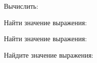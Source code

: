 \begin{enumcols}[label=\textbf{\arabic*.}]
	\item Вычислить:
	\begin{enumcols}[itemcolumns=2]
		\item {}
		\item {}
		\item {}
		\item {}
		\item {}
		\item {}
	\end{enumcols}
	\item Найти значение выражения:
	\begin{enumcols}[itemcolumns=2]
		\item {}
		\item {}
	\end{enumcols}
	\item {}
	\item {}
	\item {}
	\item {}
	\item {}
	\item {}
	\item {}
	\item {}
	\item Найти значение выражения:
	\begin{enumcols}[itemcolumns=2]
		\item {}
		\item {}
		\item {}
		\item {}
	\end{enumcols}
	\item Найдите значение выражения:
	\begin{enumcols}[itemcolumns=2]
		\item {}
		\item {}
		\item {}
		\item {}
	\end{enumcols}
	\item {}
	\item {}
	\item {}

\end{enumcols}
